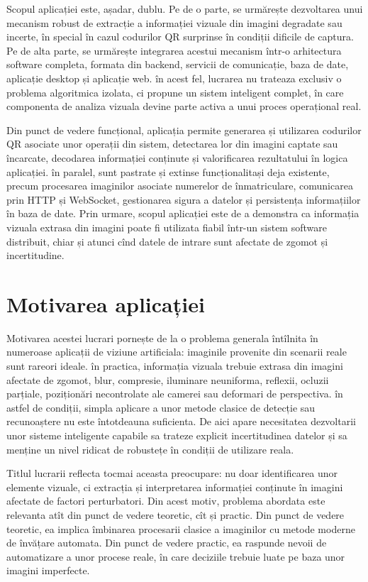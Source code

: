 Scopul aplicației este, așadar, dublu. Pe de o parte, se urmărește dezvoltarea unui mecanism robust de extracție a informației vizuale din imagini degradate sau incerte, în special în cazul codurilor QR surprinse în condiții dificile de captura. Pe de alta parte, se urmărește integrarea acestui mecanism într-o arhitectura software completa, formata din backend, servicii de comunicație, baza de date, aplicație desktop și aplicație web. în acest fel, lucrarea nu trateaza exclusiv o problema algoritmica izolata, ci propune un sistem inteligent complet, în care componenta de analiza vizuala devine parte activa a unui proces operațional real.

Din punct de vedere funcțional, aplicația permite generarea și utilizarea codurilor QR asociate unor operații din sistem, detectarea lor din imagini captate sau încarcate, decodarea informației conținute și valorificarea rezultatului în logica aplicației. în paralel, sunt pastrate și extinse funcționalitași deja existente, precum procesarea imaginilor asociate numerelor de înmatriculare, comunicarea prin HTTP și WebSocket, gestionarea sigura a datelor și persistența informațiilor în baza de date. Prin urmare, scopul aplicației este de a demonstra ca informația vizuala extrasa din imagini poate fi utilizata fiabil într-un sistem software distribuit, chiar și atunci cînd datele de intrare sunt afectate de zgomot și incertitudine.

\section{Motivarea aplicației}

Motivarea acestei lucrari pornește de la o problema generala întîlnita în numeroase aplicații de viziune artificiala: imaginile provenite din scenarii reale sunt rareori ideale. în practica, informația vizuala trebuie extrasa din imagini afectate de zgomot, blur, compresie, iluminare neuniforma, reflexii, ocluzii parțiale, poziționări necontrolate ale camerei sau deformari de perspectiva. în astfel de condiții, simpla aplicare a unor metode clasice de detecție sau recunoaștere nu este întotdeauna suficienta. De aici apare necesitatea dezvoltarii unor sisteme inteligente capabile sa trateze explicit incertitudinea datelor și sa menține un nivel ridicat de robustețe în condiții de utilizare reala.

Titlul lucrarii reflecta tocmai aceasta preocupare: nu doar identificarea unor elemente vizuale, ci extracția și interpretarea informației conținute în imagini afectate de factori perturbatori. Din acest motiv, problema abordata este relevanta atît din punct de vedere teoretic, cît și practic. Din punct de vedere teoretic, ea implica îmbinarea procesarii clasice a imaginilor cu metode moderne de învățare automata. Din punct de vedere practic, ea raspunde nevoii de automatizare a unor procese reale, în care deciziile trebuie luate pe baza unor imagini imperfecte.

